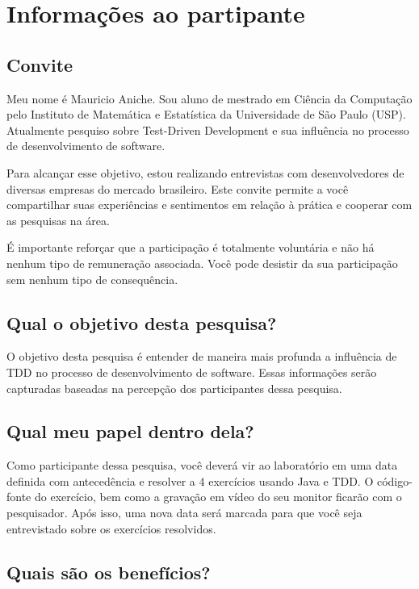 \chapter{Informações ao partipante}
\label{ape:informacoes-participante}

\section{Convite}

Meu nome é Mauricio Aniche. Sou aluno de mestrado em Ciência da Computação pelo
Instituto de Matemática e Estatística da Universidade de São Paulo (USP).
Atualmente pesquiso sobre Test-Driven Development e sua influência no processo
de desenvolvimento de software.

Para alcançar esse objetivo, estou realizando entrevistas com desenvolvedores de
diversas empresas do mercado brasileiro.
Este convite permite a você compartilhar suas experiências e sentimentos em
relação à prática e cooperar com as pesquisas na área.

É importante reforçar que a participação é totalmente voluntária e não há nenhum
tipo de remuneração associada. Você pode desistir da sua participação sem nenhum
tipo de consequência.

\section{Qual o objetivo desta pesquisa?}

O objetivo desta pesquisa é entender de maneira mais profunda a influência de TDD
no processo de desenvolvimento de software. Essas informações serão
capturadas baseadas na percepção dos participantes dessa pesquisa.

\section{Qual meu papel dentro dela?}

Como participante dessa pesquisa, você deverá vir ao laboratório em uma
data definida com antecedência e resolver a 4 exercícios usando Java e TDD.
O código-fonte do exercício, bem como a gravação em vídeo do seu monitor
ficarão com o pesquisador.
Após isso, uma nova data será marcada para que você seja entrevistado sobre
os exercícios resolvidos.

\section{Quais são os benefícios?}


